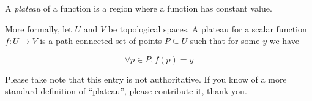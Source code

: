 \documentclass[12pt]{article}
\begin{document}
A \emph{plateau} of a function is a region where a function has constant value.

More formally, let $U$ and $V$ be topological spaces. A plateau for a scalar function $f: U \to V$ is a path-connected set of points $P \subseteq U$ such that for some $y$ we have

\begin{equation}
\forall p \in P, f(p) = y
\end{equation}

Please take note that this entry is not authoritative. If you know of a more standard definition of ``plateau'', please contribute it, thank you.
\end{document}
